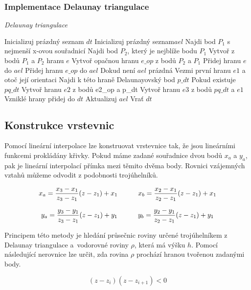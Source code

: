 \documentclass{article}
\begin{document}
\begin{spacing}{1.5}
\subsubsection*{Implementace Delaunay triangulace}
\begin{algorithm}[h]
    \caption {\textit{Delaunay triangulace}}
    \begin{algorithmic}[1]
        \State Inicializuj prázdný seznam $dt$
        \State Inicializuj prázdný seznam$ ael$
        \State Najdi bod $P_1$ s nejmenší x-ovou souřadnicí
        \State Najdi bod $P_2$, který je nejblíže bodu $P_1$
        \State Vytvoř z bodů $P_1$ a $P_2$ hranu $e$
        \State Vytvoř opačnou hranu $e\_op$ z bodů $P_2$ a $P_1$
        \State Přidej hranu $e$ do $ael$
        \State Přidej hranu $e\_op$ do $ael$
        \State Dokud není $ael$ prázdná
        \State \indent Vezmi první hranu $e1$ a otoč její orientaci
        \State \indent Najdi k této hraně Delaunayovský bod $p\_dt$
        \State \indent Pokud existuje $pq\_dt$
        \State \indent \indent Vytvoř hranu $e2$ z bodů e2\_op a p\_dt
       \State \indent \indent Vytvoř hranu $e3$ z bodů $pq\_dt$ a $e1$
       \State \indent \indent Vzniklé hrany přidej do $dt$
       \State \indent \indent Aktualizuj $ael$ 
        \State Vrať $dt$
    \end{algorithmic}
\end{algorithm}

\subsection{Konstrukce vrstevnic}
Pomocí lineární interpolace lze konstruovat vrstevnice tak, že jsou lineárními funkcemi prokládány křivky. Pokud máme zadané souřadnice dvou bodů $x_a$ a $y_a$, pak je lineární interpolací přímka mezi těmito dvěma body. Rovnici vzájemných vztahů můžeme odvodit z podobnosti trojúhelníků.

$$ x_a = \frac{x_3 - x_1}{z_3 - z_1}(z - z_1) + x_1 \indent \indent
x_b = \frac{x_2 - x_1}{z_2 - z_1}(z - z_1) + x_1 $$

$$ y_a = \frac{y_3 - y_1}{z_3 - z_1}(z - z_1) + y_1 \indent \indent
y_b = \frac{y_2 - y_1}{z_2 - z_1}(z - z_1) + y_1 $$

Principem této metody je hledání průsečnic roviny určené trojúhelníkem z Delaunay triangulace a~vodorovné roviny $\rho$, která má výšku $h$. Pomocí následující nerovnice lze určit, zda rovina $\rho$ prochází hranou tvořenou zadanými body.

$$(z - z_i)(z - z_{i+1}) < 0$$


\end{spacing}
\end{document}
